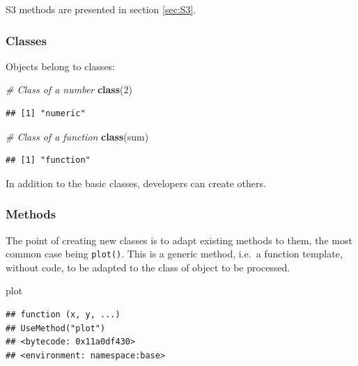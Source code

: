 \documentclass[
  12pt,
  american,
  a4paper,
  extrafontsizes,onecolumn,openright
  ]{memoir}
\newenvironment{Shaded}{\begin{snugshade}}{\end{snugshade}}
\newcommand{\CommentTok}[1]{\textcolor[rgb]{0.56,0.35,0.01}{\textit{#1}}}
\newcommand{\DecValTok}[1]{\textcolor[rgb]{0.00,0.00,0.81}{#1}}
\newcommand{\FunctionTok}[1]{\textcolor[rgb]{0.13,0.29,0.53}{\textbf{#1}}}
\newcommand{\NormalTok}[1]{#1}
\begin{document}
S3 methods are presented in section \ref{sec:S3}.

\subsubsection{Classes}\label{classes}

Objects belong to classes:

\scriptsize

\begin{Shaded}
\begin{Highlighting}[]
\CommentTok{\# Class of a number}
\FunctionTok{class}\NormalTok{(}\DecValTok{2}\NormalTok{)}
\end{Highlighting}
\end{Shaded}

\begin{verbatim}
## [1] "numeric"
\end{verbatim}

\begin{Shaded}
\begin{Highlighting}[]
\CommentTok{\# Class of a function}
\FunctionTok{class}\NormalTok{(sum)}
\end{Highlighting}
\end{Shaded}

\begin{verbatim}
## [1] "function"
\end{verbatim}

\normalsize

In addition to the basic classes, developers can create others.

\subsubsection{Methods}\label{methods}

The point of creating new classes is to adapt existing methods to them, the most common case being \texttt{plot()}.
This is a generic method, i.e.~a function template, without code, to be adapted to the class of object to be processed.

\scriptsize

\begin{Shaded}
\begin{Highlighting}[]
\NormalTok{plot}
\end{Highlighting}
\end{Shaded}

\begin{verbatim}
## function (x, y, ...) 
## UseMethod("plot")
## <bytecode: 0x11a0df430>
## <environment: namespace:base>
\end{verbatim}
\end{document}
